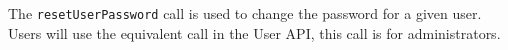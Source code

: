 The \verb+resetUserPassword+ call is used to change the password for a given user. Users will use the equivalent call in the
User API, this call is for administrators.
